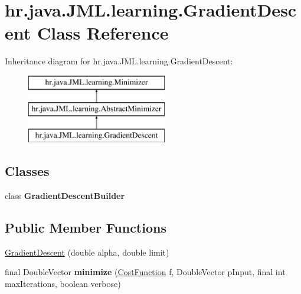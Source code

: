 \hypertarget{classhr_1_1java_1_1_j_m_l_1_1learning_1_1_gradient_descent}{\section{hr.\+java.\+J\+M\+L.\+learning.\+Gradient\+Descent Class Reference}
\label{classhr_1_1java_1_1_j_m_l_1_1learning_1_1_gradient_descent}
}
Inheritance diagram for hr.\+java.\+J\+M\+L.\+learning.\+Gradient\+Descent\+:\begin{figure}[H]
\begin{center}
\leavevmode
\includegraphics[height=3.000000cm]{classhr_1_1java_1_1_j_m_l_1_1learning_1_1_gradient_descent}
\end{center}
\end{figure}
\subsection*{Classes}
\begin{DoxyCompactItemize}
\item 
class {\bfseries Gradient\+Descent\+Builder}
\end{DoxyCompactItemize}
\subsection*{Public Member Functions}
\begin{DoxyCompactItemize}
\item 
\hyperlink{classhr_1_1java_1_1_j_m_l_1_1learning_1_1_gradient_descent_aa32d3a402cf616e329e99edb77fc158b}{Gradient\+Descent} (double alpha, double limit)
\item 
\hypertarget{classhr_1_1java_1_1_j_m_l_1_1learning_1_1_gradient_descent_a86328bc9a0e726c3cb170c9ff7f2f5d2}{final Double\+Vector {\bfseries minimize} (\hyperlink{interfacehr_1_1java_1_1_j_m_l_1_1cost_1_1_cost_function}{Cost\+Function} f, Double\+Vector p\+Input, final int max\+Iterations, boolean verbose)}\label{classhr_1_1java_1_1_j_m_l_1_1learning_1_1_gradient_descent_a86328bc9a0e726c3cb170c9ff7f2f5d2}

\end{DoxyCompactItemize}
